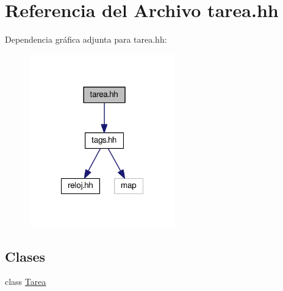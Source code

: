 \hypertarget{tarea_8hh}{\section{Referencia del Archivo tarea.\-hh}
\label{tarea_8hh}
}
Dependencia gráfica adjunta para tarea.\-hh\-:
\nopagebreak
\begin{figure}[H]
\begin{center}
\leavevmode
\includegraphics[width=179pt]{tarea_8hh__incl}
\end{center}
\end{figure}
\subsection*{Clases}
\begin{DoxyCompactItemize}
\item 
class \hyperlink{class_tarea}{Tarea}
\end{DoxyCompactItemize}
